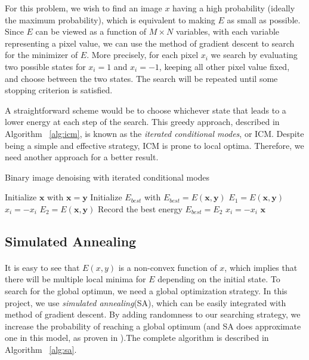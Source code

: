 \documentclass{article}
\begin{document}
For this problem, we wish to find an image $x$ having a high probability (ideally the maximum probability), which is equivalent to making $E$ as small as possible. Since $E$ can be viewed as a function of $M \times N$ variables, with each variable representing a pixel value, we can use the method of gradient descent to search for the minimizer of $E$. More precisely, for each pixel $x_{i}$ we search by evaluating two possible states for $x_{i} = 1$ and $x_{i} = −1$, keeping all other pixel value fixed, and choose between the two states. The search will be repeated until some stopping criterion is satisfied.

A straightforward scheme would be to choose whichever state that leads to a lower energy at each step of the search. This greedy approach, described in Algorithm ~\ref{alg:icm}, is known as the \textit{iterated conditional modes}, or ICM. Despite being a simple and effective strategy, ICM is prone to local optima. Therefore, we need another approach for a better result.

\begin{algorithm}
\centering
\caption{Binary image denoising with iterated conditional modes}
\label{alg:icm}
  \begin{algorithmic}[1]
        \State Initialize $\mathbf{x}$ with $\mathbf{x} = \mathbf{y}$
        \State Initialize $E_{best}$ with $E_{best} = E(\mathbf{x}, \mathbf{y})$
	    		\State $E_1 = E(\mathbf{x}, \mathbf{y})$
	    		\State $x_{i} = - x_{i}$ 
	    		\State $E_2 = E(\mathbf{x}, \mathbf{y})$
		    			\State Record the best energy $E_{best} = E_2$
		    		\EndIf
		    	\Else
		    		\State $x_{i} = - x_{i}$ 
		    	\EndIf
	    	\EndFor
	    \EndFor
      \Return $\mathbf{x}$
    \EndFunction
  \end{algorithmic}
\end{algorithm}

\subsection{Simulated Annealing}
\paragraph{}
It is easy to see that $E(x,y)$ is a non-convex function of $x$, which implies that there will be multiple local minima for $E$ depending on the initial state. To search for the global optimun, we need a global optimization strategy. In this project, we use \textit{simulated annealing}(SA), which can be easily integrated with method of gradient descent. By adding randomness to our searching strategy, we increase the probability of reaching a global optimum (and SA does approximate one in this model, as proven in \cite{geman1984stochastic}).The complete algorithm is described in Algorithm ~\ref{alg:sa}.
\end{document}
